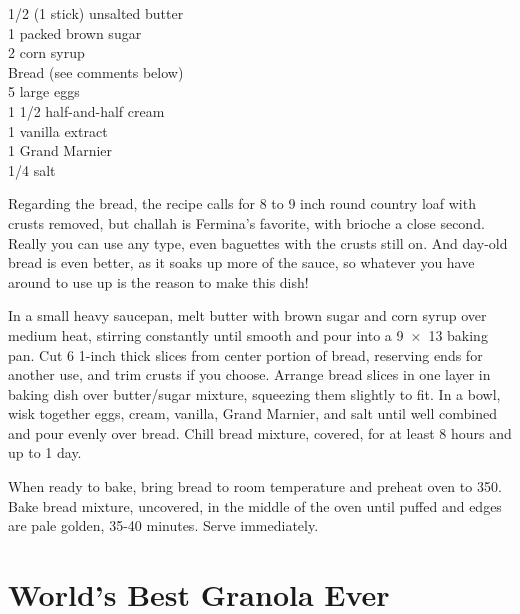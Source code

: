 \begin{open}

\end{open}
\begin{ingredients}
    \SI{1/2}{\cup} (1 stick) unsalted butter \\
    \SI{1}{\cup} packed brown sugar \\
    \SI{2}{\tblspoon} corn syrup \\
    Bread (see comments below)\\
    5 large eggs\\
    1 \SI{1/2}{\cup} half-and-half cream \\
    \SI{1}{\teaspoon} vanilla extract \\
    \SI{1}{\teaspoon} Grand Marnier \\
    \SI{1/4}{\teaspoon} salt \\
\end{ingredients}
Regarding the bread, the recipe calls for 8 to 9 inch round country loaf with crusts removed, but challah is Fermina's favorite, with brioche a close second. Really you can use any type, even baguettes with the crusts still on. And day-old bread is even better, as it soaks up more of the sauce, so whatever you have around to use up is the reason to make this dish!

In a small heavy saucepan, melt butter with brown sugar and corn syrup over medium heat, stirring constantly until smooth and pour into a \SI{9x13}{\inch} baking pan. Cut 6 1-inch thick slices from center portion of bread, reserving ends for another use, and trim crusts if you choose. Arrange bread slices in one layer in baking dish over butter/sugar mixture, squeezing them slightly to fit. In a bowl, wisk together eggs, cream, vanilla, Grand Marnier, and salt until well combined and pour evenly over bread. Chill bread mixture, covered, for at least 8 hours and up to 1 day. 

When ready to bake, bring bread to room temperature and preheat oven to \SI{350}{\degreeF}. Bake bread mixture, uncovered, in the middle of the oven until puffed and edges are pale golden, 35-40 minutes. Serve immediately. 

\section{World's Best Granola Ever}

